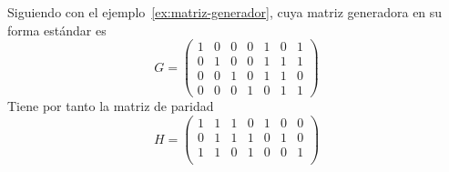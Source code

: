 Siguiendo con el ejemplo~\ref{ex:matriz-generador}, cuya matriz generadora en su forma estándar es
\[
	G=\begin{pmatrix*}
		  1&0&0&0&1&0&1\\
		  0&1&0&0&1&1&1\\
		  0&0&1&0&1&1&0\\
		  0&0&0&1&0&1&1
	\end{pmatrix*}
\]
Tiene por tanto la matriz de paridad
\[
	H=\begin{pmatrix*}
		  1&1&1&0&1&0&0\\
		  0&1&1&1&0&1&0\\
		  1&1&0&1&0&0&1\\
	\end{pmatrix*}
\]